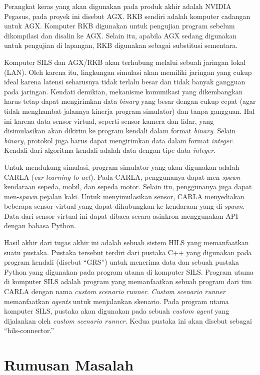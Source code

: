 Perangkat keras yang akan digunakan pada produk akhir adalah NVIDIA Pegasus,
pada proyek ini disebut AGX. RKB sendiri adalah komputer cadangan untuk AGX.
Komputer RKB digunakan untuk pengujian program sebelum dikompilasi dan disalin
ke AGX. Selain itu, apabila AGX sedang digunakan untuk pengujian di lapangan,
RKB digunakan sebagai substitusi sementara.

Komputer SILS dan AGX/RKB akan terhubung melalui sebuah jaringan lokal (LAN).
Oleh karena itu, lingkungan simulasi akan memiliki jaringan yang cukup ideal
karena latensi seharusnya tidak terlalu besar dan tidak banyak gangguan pada
jaringan. Kendati demikian, mekanisme komunikasi yang dikembangkan harus tetap
dapat mengirimkan data \textit{binary} yang besar dengan cukup cepat (agar tidak
menghambat jalannya kinerja program simulator) dan tanpa gangguan. Hal ini
karena data sensor virtual, seperti sensor kamera dan lidar, yang disimulasikan
akan dikirim ke program kendali dalam format \textit{binary}. Selain
\textit{binary}, protokol juga harus dapat mengirimkan data dalam format
\textit{integer}. Kendali dari algoritma kendali adalah data dengan tipe data
\textit{integer}.

Untuk mendukung simulasi, program simulator yang akan digunakan adalah CARLA
(\textit{car learning to act}). Pada CARLA, penggunanya dapat men-\textit{spawn}
kendaraan sepeda, mobil, dan sepeda motor. Selain itu, penggunanya juga dapat
men-\textit{spawn} pejalan kaki. Untuk menyimulasikan sensor, CARLA menyediakan
beberapa sensor virtual yang dapat dihubungkan ke kendaraan yang
di-\textit{spawn}. Data dari sensor virtual ini dapat dibaca secara asinkron
menggunakan API dengan bahasa Python.

Hasil akhir dari tugas akhir ini adalah sebuah sistem HILS yang memanfaatkan
suatu pustaka. Pustaka tersebut terdiri dari pustaka C++ yang digunakan pada
program kendali (disebut ``GRS'') untuk menerima data dan sebuah pustaka Python
yang digunakan pada program utama di komputer SILS. Program utama di komputer
SILS adalah program yang memanfaatkan sebuah program dari tim CARLA dengan nama
\textit{custom scenario runner}. \textit{Custom scenario runner} memanfaatkan
\textit{agents} untuk menjalankan skenario. Pada program utama komputer SILS,
pustaka akan digunakan pada sebuah \textit{custom agent} yang dijalankan oleh
\textit{custom scenario runner}. Kedua pustaka ini akan disebut sebagai
``hils-connector.''

\section{Rumusan Masalah}

